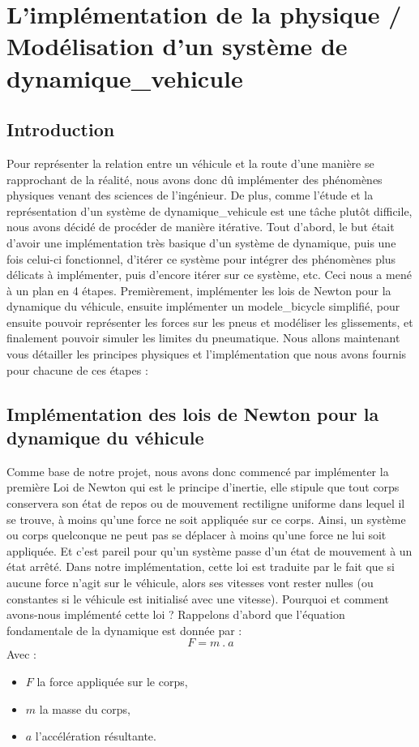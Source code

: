 \usepackage{glossaries}\section{L'implémentation de la physique / Modélisation d'un système de \gls{dynamique_vehicule}}\label{sec:l'implementation-de-la-physique-/-modelisation-d'un-systeme-de-dynamique-de-vehicule}
\subsection{Introduction}\label{subsec:introduction}
Pour représenter la relation entre un véhicule et la route d'une manière se rapprochant de la réalité, nous avons donc dû implémenter des phénomènes physiques venant des sciences de l'ingénieur.
De plus, comme l'étude et la représentation d'un système de \gls{dynamique_vehicule} est une tâche plutôt difficile, nous avons décidé de procéder de manière itérative.
Tout d'abord, le but était d'avoir une implémentation très basique d'un système de dynamique, puis une fois celui-ci fonctionnel, d'itérer ce système pour intégrer des phénomènes plus délicats à implémenter, puis d'encore itérer sur ce système, etc.
Ceci nous a mené à un plan en 4 étapes.
Premièrement, implémenter les lois de Newton pour la dynamique du véhicule, ensuite implémenter un \gls{modele_bicycle} simplifié, pour ensuite pouvoir représenter les forces sur les pneus et modéliser les glissements, et finalement pouvoir simuler les limites du pneumatique.
Nous allons maintenant vous détailler les principes physiques et l'implémentation que nous avons fournis pour chacune de ces étapes :

\subsection{Implémentation des lois de Newton pour la dynamique du véhicule}\label{subsec:implementation-des-lois-de-newton-pour-la-dynamique-du-vehicule}

Comme base de notre projet, nous avons donc commencé par implémenter la première Loi de Newton qui est le principe d'inertie, elle stipule que tout corps conservera son état de repos ou de mouvement rectiligne uniforme dans lequel il se trouve, à moins qu'une force ne soit appliquée sur ce corps.
Ainsi, un système ou corps quelconque ne peut pas se déplacer à moins qu'une force ne lui soit appliquée.
Et c'est pareil pour qu'un système passe d'un état de mouvement à un état arrêté.
Dans notre implémentation, cette loi est traduite par le fait que si aucune force n'agit sur le véhicule, alors ses vitesses vont rester nulles (ou constantes si le véhicule est initialisé avec une vitesse).
Pourquoi et comment avons-nous implémenté cette loi ?
Rappelons d'abord que l'équation fondamentale de la dynamique est donnée par :
$$F = m \ .\  a$$
Avec :
\begin{itemize}
    \item $F$ la force appliquée sur le corps,
    \item $m$ la masse du corps,
    \item $a$ l'accélération résultante.
\end{itemize}

